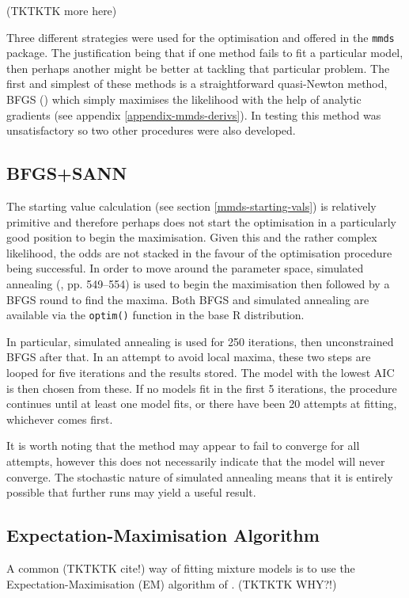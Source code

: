 (TKTKTK more here)

Three different strategies were used for the optimisation and offered in the \texttt{mmds} package. The justification being that if one method fails to fit a particular model, then perhaps another might be better at tackling that particular problem. The first and simplest of these methods is a straightforward quasi-Newton method, BFGS (\cite{bfgs}) which simply maximises the likelihood with the help of analytic gradients (see appendix \ref{appendix-mmds-derivs}). In testing this method was unsatisfactory so two other procedures were also developed.

\subsection{BFGS+SANN}
The starting value calculation (see section \ref{mmds-starting-vals}) is relatively primitive and therefore perhaps does not start the optimisation in a particularly good position to begin the maximisation. Given this and the rather complex likelihood, the odds are not stacked in the favour of the optimisation procedure being successful. In order to move around the parameter space, simulated annealing (\cite{numrec}, pp. 549--554) is used to begin the maximisation then followed by a BFGS round to find the maxima. Both BFGS and simulated annealing are available via the \texttt{optim()} function in the base \textsf{R} distribution.

In particular, simulated annealing is used for 250 iterations, then unconstrained BFGS after that. In an attempt to avoid local maxima, these two steps are looped for five iterations and the results stored. The model with the lowest AIC is then chosen from these. If no models fit in the first 5 iterations, the procedure continues until at least one model fits, or there have been 20 attempts at fitting, whichever comes first.

It is worth noting that the method may appear to fail to converge for all attempts, however this does not necessarily indicate that the model will never converge. The stochastic nature of simulated annealing means that it is entirely possible that further runs may yield a useful result.

\subsection{Expectation-Maximisation Algorithm}
A common (TKTKTK cite!) way of fitting mixture models is to use the Expectation-Maximisation (EM) algorithm of \cite{em}. (TKTKTK WHY?!)



